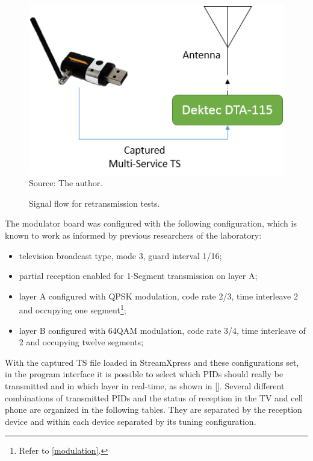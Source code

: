 \documentclass[
	12pt,				%
	openright,			%
	twoside,			%
	a4paper,			%
	brazil,
	french,				%
	english
	]{abntex2}
\begin{document}
\begin{figure}[!h]
\centering
\caption{Signal flow for retransmission tests.}
\includegraphics[width=0.5\linewidth]{figuras/test_scn_retrans.png}
\\Source: The author.
\label{fig:test_scn_retrans}
\end{figure}

The modulator board was configured with the following configuration, which is known to work as informed by previous researchers of the laboratory:

\begin{itemize}
\item television broadcast type, mode 3, guard interval 1/16;
\item partial reception enabled for 1-Segment transmission on layer A;
\item layer A configured with QPSK modulation, code rate 2/3, time interleave 2 and occupying one segment\footnote{\label{footnote_modulation}Refer to \autoref{modulation}.};
\item layer B configured with 64QAM modulation, code rate 3/4, time interleave of 2 and occupying twelve segments\footnotemark[\value{footnote}];
\end{itemize}

With the captured TS file loaded in StreamXpress and these configurations set, in the program interface it is possible to select which PIDs should really be transmitted and in which layer in real-time, as shown in \autoref{}. Several different combinations of transmitted PIDs and the status of reception in the TV and cell phone are organized in the following tables. They are separated by the reception device and within each device separated by its tuning configuration.
\end{document}
